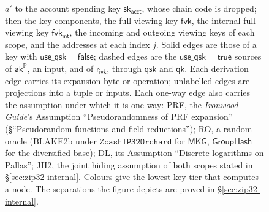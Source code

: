 \documentclass[11pt,a4paper]{article}
\theoremstyle{definition}
\newcommand{\PP}{\mathbb{P}}
\newcommand{\GroupHash}{\ensuremath{\mathsf{GroupHash}}}
\newcommand{\aksym}{\ensuremath{\mathsf{ak}}}
\newcommand{\fvk}{\ensuremath{\mathsf{fvk}}}
\newcommand{\rivk}{\ensuremath{\mathsf{r_{ivk}}}}
\begin{document}
\begin{figure}[tp]
{$a'$ to the account spending key $\mathsf{sk}_{\mathsf{acct}}$, whose chain
code is dropped; then the key components, the full viewing key $\fvk$, the
internal full viewing key $\fvk_{\mathsf{int}}$, the incoming and outgoing
viewing keys of each scope, and the addresses at each index $j$. Solid
edges are those of a key with $\mathsf{use\_qsk} = \mathsf{false}$; dashed
edges are the $\mathsf{use\_qsk} = \mathsf{true}$ sources of
$\aksym^{\PP}$, an input, and of $\rivk$, through $\mathsf{qsk}$ and
$\mathsf{qk}$. Each derivation edge carries its expansion byte or operation;
unlabelled edges are projections into a tuple or inputs. Each one-way edge
also carries the assumption under which it is one-way: PRF, the
\emph{Ironwood Guide}'s Assumption ``Pseudorandomness of PRF expansion''
(\S``Pseudorandom functions and field reductions''); RO, a random oracle
(BLAKE2b under $\texttt{ZcashIP32Orchard}$ for $\mathsf{MKG}$, $\GroupHash$ for
the diversified base); DL, its Assumption ``Discrete logarithms on Pallas'';
JH2, the joint hiding assumption of both scopes stated in
\S\ref{sec:zip32-internal}. Colours give the lowest key tier that computes a
node. The separations the figure depicts are proved in
\S\ref{sec:zip32-internal}.}
\label{fig:keypath}
\end{figure}
\end{document}
